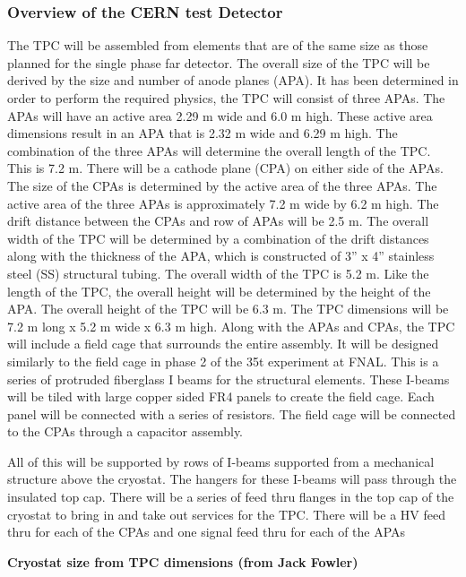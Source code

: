 \subsubsection{Overview of the CERN test Detector}


The TPC will be assembled from elements that are of the same size as those planned for the single phase far detector.  The overall size of the TPC will be derived by the size and number of anode planes (APA).  It has been determined in order to perform the required physics, the TPC will consist of three APAs.  The APAs will have an active area 2.29 m wide and 6.0 m high.  These active area dimensions result in an APA that is 2.32 m wide and 6.29 m high.  The combination of the three APAs will determine the overall length of the TPC.  This is 7.2 m.  There will be a cathode plane (CPA) on either side of the APAs.  The size of the CPAs is determined by the active area of the three APAs.  The active area of the three APAs is approximately 7.2 m wide by 6.2 m high.  The drift distance between the CPAs and row of APAs will be 2.5 m.  The overall width of the TPC will be determined by a combination of the drift distances along with the thickness of the APA, which is constructed of 3” x 4” stainless steel (SS) structural tubing.  The overall width of the TPC is 5.2 m.  Like the length of the TPC, the overall height will be determined by the height of the APA.  The overall height of the TPC will be 6.3 m.  The TPC dimensions will be 7.2 m long x 5.2 m wide x 6.3 m high. Along with the APAs and CPAs, the TPC will include a field cage that surrounds the entire assembly.  It will be designed similarly to the field cage in phase 2 of the 35t experiment at FNAL.  This is a series of protruded fiberglass I beams for the structural elements.  These I-beams will be tiled with large copper sided FR4 panels to create the field cage.  Each panel will be connected with a series of resistors.  The field cage will be connected to the CPAs through a capacitor assembly.

All of this will be supported by rows of I-beams supported from a mechanical structure above the cryostat.  The hangers for these I-beams will pass through the insulated top cap.  There will be a series of feed thru flanges in the top cap of the cryostat to bring in and take out services for the TPC.  There will be a HV feed thru for each of the CPAs and one signal feed thru for each of the APAs

\textbf{Cryostat size from TPC dimensions  (from Jack Fowler)}

